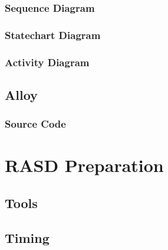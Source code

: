 \documentclass[11pt,a4paper]{report}
\begin{document}
\subsection{Sequence Diagram}
\subsection{Statechart Diagram}
\subsection{Activity Diagram}
\section{Alloy}
\subsection{Source Code}
\chapter{RASD Preparation}
\section{Tools}
\section{Timing}



\end{document}
